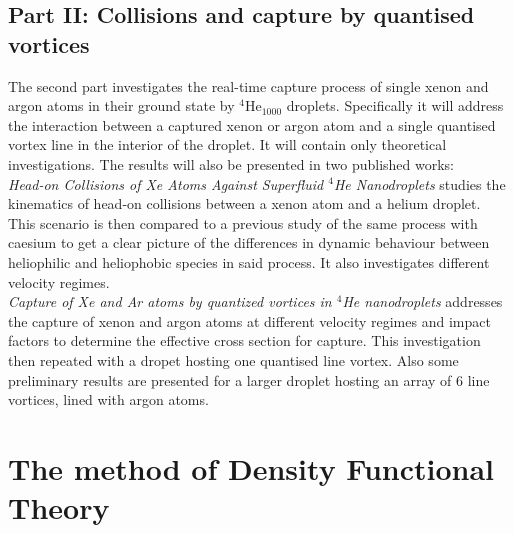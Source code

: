\documentclass[11pt,a4paper,twoside]{article}
\begin{document}
		\subsection{Part II: Collisions and capture by quantised vortices}
			The second part investigates the real-time capture process of single xenon and argon atoms in their ground state by $^4$He$_{1000}$ droplets. Specifically it will address the interaction between a captured xenon or argon atom and a single quantised vortex line in the interior of the droplet. It will contain only theoretical investigations. The results will also be presented in two published works:\\
		
			\emph{Head-on Collisions of Xe Atoms Against Superfluid $^4\!$He Nanodroplets} studies the kinematics of head-on collisions between a xenon atom and a helium droplet. This scenario is then compared to a previous study of the same process with caesium to get a clear picture of the differences in dynamic behaviour between heliophilic and heliophobic species in said process. It also investigates different velocity regimes.\\
		
			\emph{Capture of Xe and Ar atoms by quantized vortices in $^4\!$He nanodroplets} addresses the capture of xenon and argon atoms at different velocity regimes and impact factors to determine the effective cross section for capture. This investigation then repeated with a dropet hosting one quantised line vortex. Also some preliminary results are presented for a larger droplet hosting an array of 6 line vortices, lined with argon atoms.

		\newpage
		\section{The method of Density Functional Theory}
		
\end{document}
